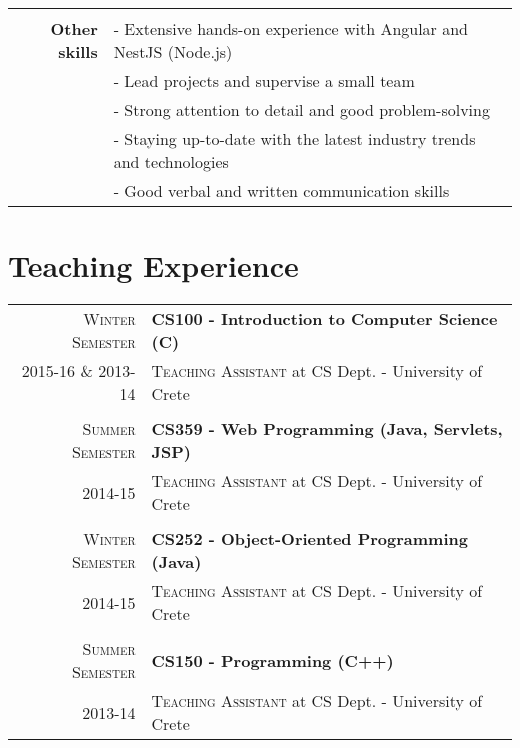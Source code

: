 \documentclass[11pt]{article}
\begin{document}
\begin{longtable}{rp{12cm}}
\multicolumn{2}{c}{} \\
\textbf{Other skills} 
& - Extensive hands-on experience with Angular and NestJS (Node.js) \\
& - Lead projects and supervise a small team \\
& - Strong attention to detail and good problem-solving \\
& - Staying up-to-date with the latest industry trends and technologies \\
& - Good verbal and written communication skills \\



\end{longtable}

\section{Teaching Experience}

\begin{longtable}{r|p{12.5cm}}

\textsc{Winter Semester} & \textbf{CS100 - Introduction to Computer Science (C)}  \\
\textsc{2015-16 \& 2013-14} &\textsc{Teaching Assistant} at CS Dept. - University of Crete \\

\multicolumn{2}{c}{} \\
\textsc{Summer Semester} & \textbf{CS359 - Web Programming (Java, Servlets, JSP)}  \\
\textsc{2014-15} &\textsc{Teaching Assistant} at CS Dept. - University of Crete\\

\multicolumn{2}{c}{} \\
\textsc{Winter Semester} & \textbf{CS252 - Object-Oriented Programming (Java)}  \\
\textsc{2014-15} &\textsc{Teaching Assistant} at CS Dept. - University of Crete\\

\multicolumn{2}{c}{} \\
\textsc{Summer Semester} & \textbf{CS150 - Programming (C++)}  \\
\textsc{2013-14} &\textsc{Teaching Assistant} at CS Dept. - University of Crete\\

\end{longtable}
\end{document}
